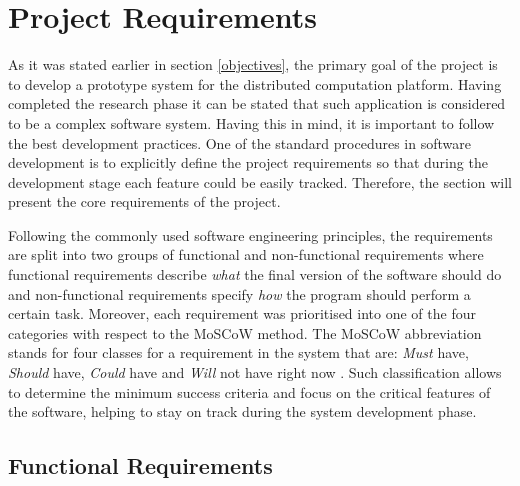 \documentclass[10pt]{report}
\begin{document}
\section{Project Requirements}


As it was stated earlier in section \ref{objectives}, the primary goal of the project is to develop a prototype system for the distributed computation platform. Having completed the research phase it can be stated that such application is considered to be a complex software system. Having this in mind, it is important to follow the best development practices. One of the standard procedures in software development is to explicitly define the project requirements so that during the development stage each feature could be easily tracked. Therefore, the section will present the core requirements of the project.
\newline

Following the commonly used software engineering principles, the requirements are split into two groups of functional and non-functional requirements where functional requirements describe \textit{what} the final version of the software should do and non-functional requirements specify \textit{how} the program should perform a certain task. Moreover, each requirement was prioritised into one of the four categories with respect to the MoSCoW method. The MoSCoW abbreviation stands for four classes for a requirement in the system that are: \textit{Must} have, \textit{Should} have, \textit{Could} have and \textit{Will} not have right now \cite{moscow}. Such classification allows to determine the minimum success criteria and focus on the critical features of the software, helping to stay on track during the system development phase.

\subsection{Functional Requirements} \label{functional}
\end{document}
